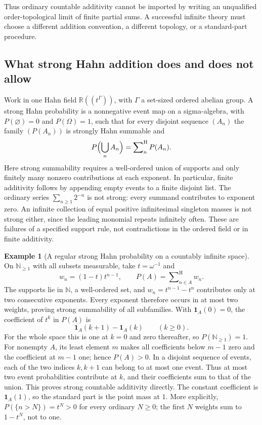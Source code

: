 \documentclass[11pt,a4paper]{article}
\numberwithin{equation}{section}
\theoremstyle{definition}
\newtheorem{example}[theorem]{Example}
\theoremstyle{remark}
\newcommand{\R}{\mathbb R}
\newcommand{\N}{\mathbb N}
\newcommand{\ind}{\mathbf 1}
\newcommand{\hsum}{\mathop{\sum}\nolimits^{\mathrm H}}
\begin{document}
Thus ordinary countable additivity cannot be imported by writing an
unqualified order-topological limit of finite partial sums. A successful
infinite theory must choose a different addition convention, a different
topology, or a standard-part procedure.

\subsection{What strong Hahn addition does and does not allow}

Work in one Hahn field $\R((t^\Gamma))$, with $\Gamma$ a set-sized
ordered abelian group. A strong Hahn probability is a nonnegative event
map on a sigma-algebra, with $P(\varnothing)=0$ and $P(\Omega)=1$,
such that for every disjoint sequence $(A_n)$ the family $(P(A_n))$ is
strongly Hahn summable and
\begin{equation}
 P\Bigl(\bigcup_n A_n\Bigr)=\hsum_nP(A_n).
\end{equation}
Here strong summability requires a well-ordered union of supports and
only finitely many nonzero contributions at each exponent. In particular,
finite additivity follows by appending empty events to a finite disjoint list.
The ordinary series $\sum_{n\ge1}2^{-n}$ is not strong: every summand contributes
to exponent zero. An infinite collection of equal positive infinitesimal
singleton masses is not strong either, since the leading monomial repeats
infinitely often. These are failures of a specified support rule, not
contradictions in the ordered field or in finite additivity.

\begin{example}[A regular strong Hahn probability on a countably infinite space]
\label{fsp:ex:geometric}
On $\N_{\ge1}$ with all subsets measurable, take $t=\omega^{-1}$ and
\begin{equation}
 w_n=(1-t)t^{n-1},\qquad
 P(A)=\hsum_{n\in A}w_n.
\end{equation}
The supports lie in $\N$, a well-ordered set, and
$w_n=t^{n-1}-t^n$ contributes only at two consecutive exponents.
Every exponent therefore occurs in at most two weights, proving strong
summability of all subfamilies. With $\ind_A(0)=0$, the coefficient of
$t^k$ in $P(A)$ is
\[
 \ind_A(k+1)-\ind_A(k)\qquad(k\ge0).
\]
For the whole space this is one at $k=0$ and zero thereafter, so
$P(\N_{\ge1})=1$. For nonempty $A$, its least element $m$ makes
all coefficients below $m-1$ zero and the coefficient at $m-1$ one;
hence $P(A)>0$. In a disjoint sequence of events, each of the two
indices $k,k+1$ can belong to at most one event. Thus at most two
event probabilities contribute at $k$, and their coefficients sum to
that of the union. This proves strong countable additivity directly.
The constant coefficient is $\ind_A(1)$, so the standard part is the
point mass at $1$. More explicitly,
$P(\{n>N\})=t^N>0$ for every ordinary $N\ge0$; the first $N$
weights sum to $1-t^N$, not to one.
\end{example}
\end{document}
